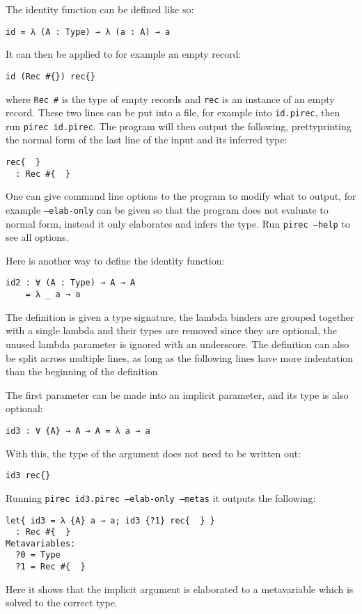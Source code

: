 The identity function can be defined like so:
\begin{verbatim}
id = λ (A : Type) → λ (a : A) → a
\end{verbatim}
It can then be applied to for example an empty record:
\begin{verbatim}
id (Rec #{}) rec{}
\end{verbatim}
where \texttt{Rec #{}} is the type of empty records
and \texttt{rec{}} is an instance of an empty
record. These two lines can be put into a file, for example into
\texttt{id.pirec}, then run \texttt{pirec id.pirec}. The program will
then output the following, prettyprinting the normal form of the last line of
the input and its inferred type:
\begin{verbatim}
rec{  }
  : Rec #{  }
\end{verbatim}
One can give command line options to the program to modify what to output, for
example \texttt{--elab-only} can be given so that the program does not
evaluate to normal form, instead it only elaborates and infers the type. Run
\texttt{pirec --help} to see all options.

Here is another way to define the identity function:
\begin{verbatim}
id2 : ∀ (A : Type) → A → A
    = λ _ a → a
\end{verbatim}
The definition is given a type signature, the lambda binders are grouped
together with a single lambda and their types are removed since they are
optional, the unused lambda parameter is ignored with an underscore. The
definition can also be split across multiple lines, as long as the following
lines have more indentation than the beginning of the definition

The first parameter can be made into an implicit parameter, and its type is also
optional:
\begin{verbatim}
id3 : ∀ {A} → A → A = λ a → a
\end{verbatim}
With this, the type of the argument does not need to be written out:
\begin{verbatim}
id3 rec{}
\end{verbatim}
Running \texttt{pirec id3.pirec --elab-only --metas} it outputs the
following:
\begin{verbatim}
let{ id3 = λ {A} a → a; id3 {?1} rec{  } }
  : Rec #{  }
Metavariables:
  ?0 = Type
  ?1 = Rec #{  }
\end{verbatim}
Here it shows that the implicit argument is elaborated to a metavariable which
is solved to the correct type.


